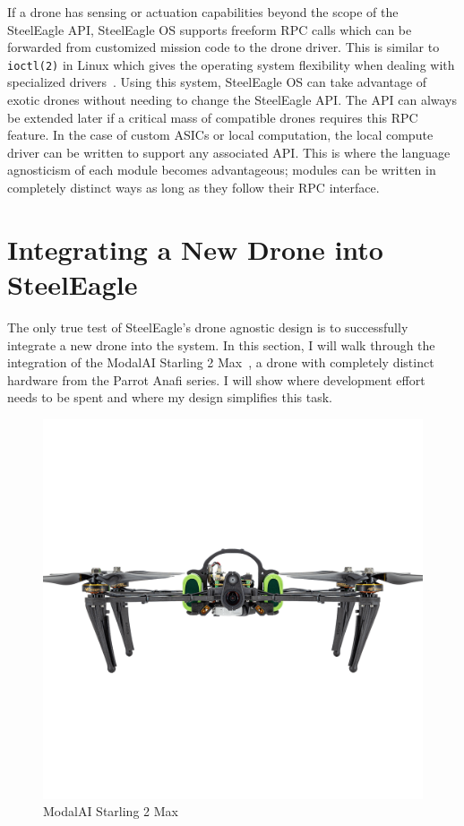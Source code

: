 If a drone has sensing or actuation capabilities beyond the scope of the SteelEagle API, SteelEagle OS supports freeform RPC calls which can be forwarded from customized mission code to the drone driver. This is similar to \verb|ioctl(2)| in Linux which gives the operating system flexibility when dealing with specialized drivers~\cite{Linux}. Using this system, SteelEagle OS can take advantage of exotic drones without needing to change the SteelEagle API. The API can always be extended later if a critical mass of compatible drones requires this RPC feature. In the case of custom ASICs or local computation, the local compute driver can be written to support any associated API. This is where the language agnosticism of each module becomes advantageous; modules can be written in completely distinct ways as long as they follow their RPC interface. 

\section{Integrating a New Drone into SteelEagle}
\label{sec:new-drone}

The only true test of SteelEagle's drone agnostic design is to successfully integrate a new drone into the system. In this section, I will walk through the integration of the ModalAI Starling 2 Max~\cite{ModalAIStarling2Max}, a drone with completely distinct hardware from the Parrot Anafi series. I will show where development effort needs to be spent and where my design simplifies this task.

\begin{figure}
    \centering
    \vspace{-0.8in}
    \includegraphics[width=0.6\linewidth]{chapter7/FIGS/starling2max.png}
    \vspace{-0.8in}
    \caption{ModalAI Starling 2 Max~\cite{ModalAIStarling2Max}}
    \label{fig:starling}
\end{figure}

